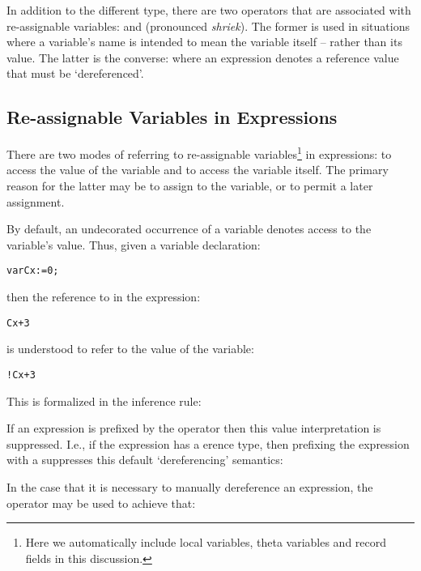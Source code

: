 In addition to the different type, there are two operators that are associated with re-assignable variables:  and \q{!} (pronounced \emph{shriek}). The former is used in situations where a variable's name is intended to mean the variable itself -- rather than its value. The latter is the converse: where an expression denotes a reference value that must be `dereferenced'.

\subsection{Re-assignable Variables in Expressions}
\label{referRef}
There are two modes of referring to re-assignable variables\footnote{Here we automatically include local variables, theta variables and record fields in this discussion.} in expressions: to access the value of the variable and to access the variable itself. The primary reason for the latter may be to assign to the variable, or to permit a later assignment.

By default, an undecorated occurrence of a variable denotes access to the variable's value. Thus, given a variable declaration:
\begin{alltt}
var Cx := 0;
\end{alltt}
then the reference to  in the expression:
\begin{alltt}
Cx+3
\end{alltt}
is understood to refer to the value of the variable:
\begin{alltt}
!Cx+3
\end{alltt}
This is formalized in the inference rule:
\begin{prooftree}
\end{prooftree}

If an expression is prefixed by the  operator then this value interpretation is suppressed. I.e., if the expression has a erence type, then prefixing the expression with a  suppresses this default `dereferencing' semantics:

\begin{prooftree}
\end{prooftree}

In the case that it is necessary to manually dereference an expression, the \q{!} operator may be used to achieve that:
\begin{prooftree}
\end{prooftree}

